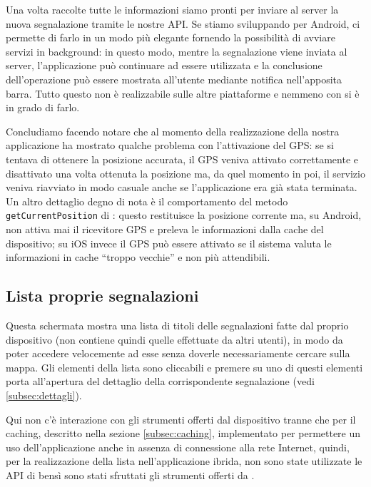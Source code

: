             Una volta raccolte tutte le informazioni siamo pronti per inviare
            al server la nuova segnalazione tramite le nostre API. Se stiamo
            sviluppando per Android, \tisdk{} ci permette di farlo in un modo
            più elegante fornendo la possibilità di avviare servizi in
            background: in questo modo, mentre la segnalazione viene inviata al
            server, l'applicazione può continuare ad essere utilizzata e la
            conclusione dell'operazione può essere mostrata all'utente mediante
            notifica nell'apposita barra. Tutto questo non è realizzabile sulle
            altre piattaforme e nemmeno con \pg{} si è in grado di farlo.

            Concludiamo facendo notare che al momento della realizzazione della
            nostra applicazione \pg{} ha mostrato qualche problema con
            l'attivazione del GPS: se si tentava di ottenere la posizione
            accurata, il GPS veniva attivato correttamente e disattivato una
            volta ottenuta la posizione ma, da quel momento in poi, il servizio
            veniva riavviato in modo casuale anche se l'applicazione era già
            stata terminata. Un altro dettaglio degno di nota è il comportamento
            del metodo \texttt{getCurrentPosition} di \tisdk{}: questo
            restituisce la posizione corrente ma, su Android, non attiva mai il
            ricevitore GPS e preleva le informazioni dalla cache del
            dispositivo; su iOS invece il GPS può essere attivato se il sistema
            valuta le informazioni in cache ``troppo vecchie'' e non più
            attendibili.

        \subsection{Lista proprie segnalazioni}
        \label{subsec:proprie}
            Questa schermata mostra una lista di titoli delle segnalazioni fatte
            dal proprio dispositivo (non contiene quindi quelle effettuate da altri
            utenti), in modo da poter accedere velocemente ad esse
            senza doverle necessariamente cercare sulla mappa.
            Gli elementi della lista sono cliccabili e premere su uno di questi
            elementi porta all'apertura del dettaglio della corrispondente
            segnalazione (vedi \ref{subsec:dettagli}).

            Qui non c'è interazione con gli strumenti offerti dal dispositivo
            tranne che per il caching, descritto nella sezione
            \ref{subsec:caching},
            implementato per permettere un uso dell'applicazione
            anche in assenza di connessione alla rete Internet,
            quindi, per la realizzazione della lista nell'applicazione ibrida, non sono
            state utilizzate le API di \pg{} bensì sono stati sfruttati gli
            strumenti offerti da \kendomob{}.

